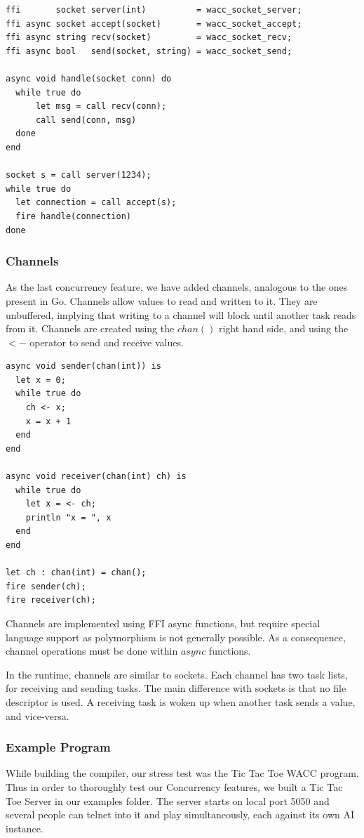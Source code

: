 \documentclass{article}
\begin{document}
\begin{lstlisting}
ffi       socket server(int)          = wacc_socket_server;
ffi async socket accept(socket)       = wacc_socket_accept;
ffi async string recv(socket)         = wacc_socket_recv;
ffi async bool   send(socket, string) = wacc_socket_send;

async void handle(socket conn) do
  while true do
      let msg = call recv(conn);
      call send(conn, msg)
  done
end

socket s = call server(1234);
while true do
  let connection = call accept(s);
  fire handle(connection)
done
\end{lstlisting}

\subsubsection{Channels}
As the last concurrency feature, we have added channels, analogous to the ones present in Go.
Channels allow values to read and written to it. They are unbuffered, implying that writing to a channel will block
until another task reads from it. Channels are created using the $chan()$ right hand side, and using the $<-$ operator
to send and receive values.

\begin{lstlisting}
async void sender(chan(int)) is
  let x = 0;
  while true do
    ch <- x;
    x = x + 1
  end
end

async void receiver(chan(int) ch) is
  while true do
    let x = <- ch;
    println "x = ", x
  end
end

let ch : chan(int) = chan();
fire sender(ch);
fire receiver(ch);
\end{lstlisting}

Channels are implemented using FFI async functions, but require special language support as polymorphism is not generally
possible. As a consequence, channel operations must be done within $async$ functions.

In the runtime, channels are similar to sockets. Each channel has two task lists, for receiving and sending tasks.
The main difference with sockets is that no file descriptor is used. A receiving task is woken up when another task sends
a value, and vice-versa.

\subsubsection{Example Program}
While building the compiler, our stress test was the Tic Tac Toe WACC program. Thus in order to thoroughly test our Concurrency features, we built a
Tic Tac Toe Server in our examples folder. The server starts on local port 5050 and several people can telnet into it and play simultaneously, each against its
own AI instance. 
\end{document}
